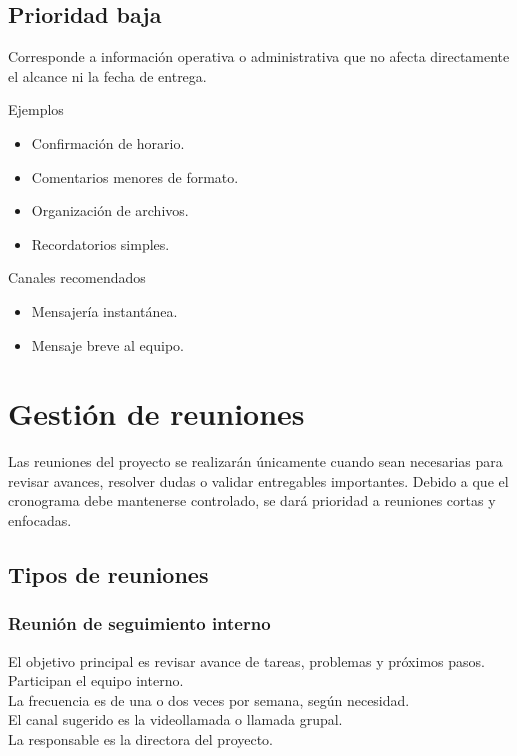 \documentclass[11pt,spanish]{article}
\begin{document}
\subsection{Prioridad baja}

Corresponde a información operativa o administrativa que no afecta directamente el alcance ni la fecha de entrega.

\noindent Ejemplos

\begin{itemize}
    \item Confirmación de horario.
    \item Comentarios menores de formato.
    \item Organización de archivos.
    \item Recordatorios simples.
\end{itemize}

\noindent Canales recomendados

\begin{itemize}
    \item Mensajería instantánea.
    \item Mensaje breve al equipo.
\end{itemize}

\section{Gestión de reuniones}

Las reuniones del proyecto se realizarán únicamente cuando sean necesarias para revisar avances, resolver dudas o validar entregables importantes. Debido a que el cronograma debe mantenerse controlado, se dará prioridad a reuniones cortas y enfocadas.

\subsection{Tipos de reuniones}

\subsubsection{Reunión de seguimiento interno}

\noindent El objetivo principal es revisar avance de tareas, problemas y próximos pasos.\\
Participan el equipo interno.\\
La frecuencia es de una o dos veces por semana, según necesidad.\\
El canal sugerido es la videollamada o llamada grupal.\\
La responsable es la directora del proyecto.
\end{document}

